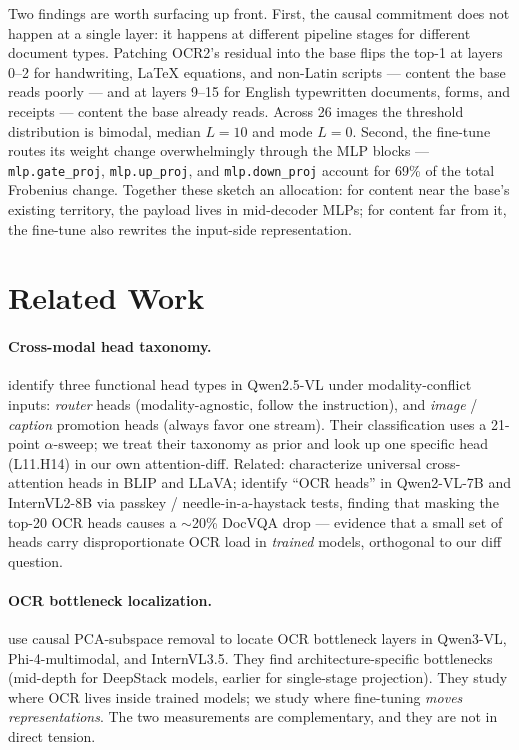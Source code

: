 \documentclass[10pt,twocolumn,letterpaper]{article}
\begin{document}
Two findings are worth surfacing up front. First, the causal commitment does not happen at a single layer: it happens at different pipeline stages for different document types. Patching OCR2's residual into the base flips the top-1 at layers 0--2 for handwriting, LaTeX equations, and non-Latin scripts --- content the base reads poorly --- and at layers 9--15 for English typewritten documents, forms, and receipts --- content the base already reads. Across 26 images the threshold distribution is bimodal, median $L = 10$ and mode $L = 0$. Second, the fine-tune routes its weight change overwhelmingly through the MLP blocks --- \texttt{mlp.gate\_proj}, \texttt{mlp.up\_proj}, and \texttt{mlp.down\_proj} account for 69\% of the total Frobenius change. Together these sketch an allocation: for content near the base's existing territory, the payload lives in mid-decoder MLPs; for content far from it, the fine-tune also rewrites the input-side representation.

\section{Related Work}
\label{sec:related}

\paragraph{Cross-modal head taxonomy.} \citet{hua2025conflicting} identify three functional head types in Qwen2.5-VL under modality-conflict inputs: \emph{router} heads (modality-agnostic, follow the instruction), and \emph{image} / \emph{caption} promotion heads (always favor one stream). Their classification uses a 21-point $\alpha$-sweep; we treat their taxonomy as prior and look up one specific head (L11.H14) in our own attention-diff. Related: \citet{golovanevsky2024notice} characterize universal cross-attention heads in BLIP and LLaVA; \citet{baek2025ocrheads} identify ``OCR heads'' in Qwen2-VL-7B and InternVL2-8B via passkey / needle-in-a-haystack tests, finding that masking the top-20 OCR heads causes a $\sim$20\% DocVQA drop --- evidence that a small set of heads carry disproportionate OCR load in \emph{trained} models, orthogonal to our diff question.

\paragraph{OCR bottleneck localization.} \citet{steinberg2026ocrrouting} use causal PCA-subspace removal to locate OCR bottleneck layers in Qwen3-VL, Phi-4-multimodal, and InternVL3.5. They find architecture-specific bottlenecks (mid-depth for DeepStack models, earlier for single-stage projection). They study where OCR lives inside trained models; we study where fine-tuning \emph{moves representations}. The two measurements are complementary, and they are not in direct tension.
\end{document}
